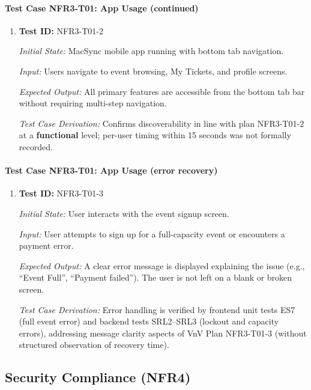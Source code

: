 \documentclass[12pt, titlepage]{article}
\begin{document}
\paragraph{Test Case NFR3-T01: App Usage (continued)}

\begin{enumerate}

\item \textbf{Test ID:} NFR3-T01-2

\textit{Initial State:} MacSync mobile app running with bottom tab navigation.

\textit{Input:} Users navigate to event browsing, My Tickets, and profile screens.

\textit{Expected Output:} All primary features are accessible from the bottom tab bar without requiring multi-step navigation.

\textit{Test Case Derivation:} Confirms discoverability in line with plan NFR3-T01-2 at a \textbf{functional} level; per-user timing within 15 seconds was not formally recorded.

\end{enumerate}


\paragraph{Test Case NFR3-T01: App Usage (error recovery)}

\begin{enumerate}

\item \textbf{Test ID:} NFR3-T01-3

\textit{Initial State:} User interacts with the event signup screen.

\textit{Input:} User attempts to sign up for a full-capacity event or encounters a payment error.

\textit{Expected Output:} A clear error message is displayed explaining the issue (e.g., ``Event Full'', ``Payment failed''). The user is not left on a blank or broken screen.

\textit{Test Case Derivation:} Error handling is verified by frontend unit tests ES7 (full event error) and backend tests SRL2--SRL3 (lockout and capacity errors), addressing message clarity aspects of VnV Plan NFR3-T01-3 (without structured observation of recovery time).

\end{enumerate}


\subsection{Security Compliance (NFR4)}
\end{document}
